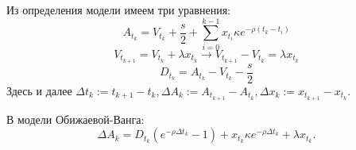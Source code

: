 Из определения модели имеем три уравнения:
\begin{equation} \label{rp1}
    A_{t_k} = V_{t_k} + \frac{s}{2} + \sum _{i=0} ^{k-1} x_{t_i} \kappa e^{- \rho (t_k - t_i)}
\end{equation}
\begin{equation}\label{rp2}
    V_{t_{k+1}} = V_{t_k} + \lambda x_{t_k} \rightarrow V_{t_{k+1}} - V_{t_k} = \lambda x_{t_{k}}
\end{equation}
\begin{equation} \label{rp3}
    D_{t_k} = A_{t_k} - V_{t_k} - \frac{s}{2}
\end{equation}
Здесь и далее $\Delta t_{k} := t_{k+1} - t_k, \Delta A_{k} := A_{t_{k+1}} - A_{t_k}, \Delta x_{k} := x_{t_{k+1}} - x_{t_k}$.
\begin{lemma} \label{mainregrOW}
    В модели Обижаевой-Ванга:
    \begin{equation*}
        \Delta A_k = D_{t_k} (e^{- \rho \Delta t_k} - 1) + x_{t_k} \kappa e^{- \rho \Delta t_k} + \lambda x_{t_k} .
    \end{equation*}
\end{lemma}
